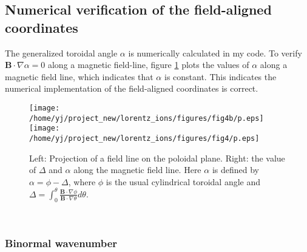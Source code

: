 \documentclass{llncs}
\begin{document}
\subsection{Numerical verification of the field-aligned coordinates}

The generalized toroidal angle $\alpha$ is numerically calculated in my code.
To verify $\mathbf{B} \cdot \nabla \alpha = 0$ along a magnetic field-line,
figure \ref{17-10-2-p1} plots the values of $\alpha$ along a magnetic field
line, which indicates that $\alpha$ is constant. This indicates the numerical
implementation of the field-aligned coordinates is correct.

\begin{figure}[h]
  \texttt{[image: /home/yj/project\_new/lorentz\_ions/figures/fig4b/p.eps]}\texttt{[image: /home/yj/project\_new/lorentz\_ions/figures/fig4/p.eps]}
  \caption{\label{17-10-2-p1}Left: Projection of a field line on the poloidal
  plane. Right: the value of $\Delta$ and $\alpha$ along the magnetic field
  line. Here $\alpha$ is defined by $\alpha = \phi - \Delta$, where $\phi$ is
  the usual cylindrical toroidal angle and $\Delta = \int_0^{\theta}
  \frac{\mathbf{B} \cdot \nabla \phi}{\mathbf{B} \cdot \nabla \theta} d
  \theta$.}
\end{figure}

\

\subsubsection{Binormal wavenumber}
\end{document}
